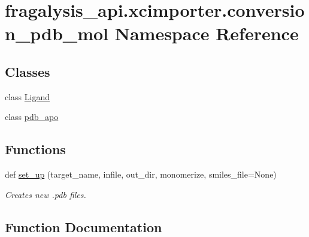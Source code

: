 \hypertarget{namespacefragalysis__api_1_1xcimporter_1_1conversion__pdb__mol}{}\section{fragalysis\+\_\+api.\+xcimporter.\+conversion\+\_\+pdb\+\_\+mol Namespace Reference}
\label{namespacefragalysis__api_1_1xcimporter_1_1conversion__pdb__mol}
\subsection*{Classes}
\begin{DoxyCompactItemize}
\item 
class \hyperlink{classfragalysis__api_1_1xcimporter_1_1conversion__pdb__mol_1_1_ligand}{Ligand}
\item 
class \hyperlink{classfragalysis__api_1_1xcimporter_1_1conversion__pdb__mol_1_1pdb__apo}{pdb\+\_\+apo}
\end{DoxyCompactItemize}
\subsection*{Functions}
\begin{DoxyCompactItemize}
\item 
def \hyperlink{namespacefragalysis__api_1_1xcimporter_1_1conversion__pdb__mol_ab8fa8ff14ff0439b99603cbbd33472e2}{set\+\_\+up} (target\+\_\+name, infile, out\+\_\+dir, monomerize, smiles\+\_\+file=None)
\begin{DoxyCompactList}\small\item\em Creates new .pdb files. \end{DoxyCompactList}\end{DoxyCompactItemize}


\subsection{Function Documentation}
\mbox{\label{namespacefragalysis__api_1_1xcimporter_1_1conversion__pdb__mol_ab8fa8ff14ff0439b99603cbbd33472e2}} 
